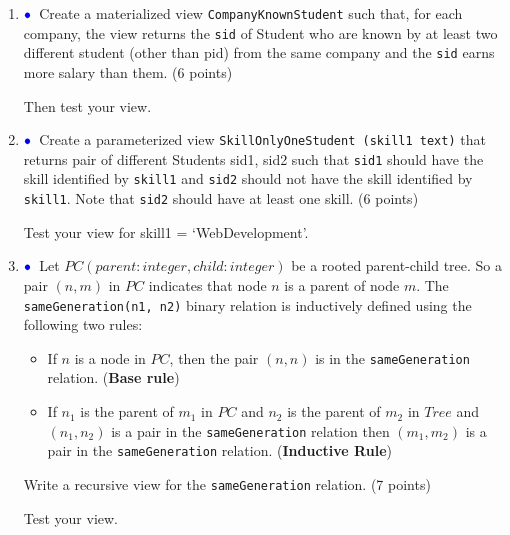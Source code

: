 \documentclass[11pt]{article}
\newcommand{\blue}[1]{{\color{blue}#1}}
\newcommand{\bluebullet}{$\blue{\bullet}$}
\begin{document}
\begin{enumerate}[resume]

\item  \label{viewtriangle} \bluebullet\ 
Create a materialized view {\tt CompanyKnownStudent} such that, for each company, the view returns the {\tt sid} of Student who are known by at least two different student (other than pid) from the same company and the {\tt sid} earns more salary than them. (6 points)


Then test your view. 

\item \bluebullet\ 	Create a parameterized view {\tt SkillOnlyOneStudent (skill1 text)} that returns pair of different Students sid1, sid2 such that {\tt sid1} should have the skill identified by {\tt skill1} and {\tt sid2} should not have the skill identified by {\tt skill1}. 
Note that {\tt sid2} should have at least one skill. (6 points)

Test your view for skill1 = ‘WebDevelopment’. 

\item \bluebullet\  Let $PC(parent: integer, child: integer)$ be a rooted parent-child tree.   So a pair $(n,m)$ in $PC$ indicates that node $n$ is a parent of node $m$.
The {\tt sameGeneration(n1, n2)} binary relation is inductively defined using the following two rules:
\begin{itemize}
\item If $n$ is a node in $PC$, then the pair $(n,n)$ is in the {\tt sameGeneration} relation. ({\bf Base rule})
\item If $n_1$ is the parent of $m_1$ in $PC$ and $n_2$ is the parent of $m_2$ in $Tree$ and 
$(n_1,n_2)$ is a pair in the {\tt sameGeneration} relation then $(m_1,m_2)$ is a pair in the {\tt sameGeneration} relation. ({\bf Inductive Rule})
\end{itemize}

Write a \blue{recursive view} for the {\tt sameGeneration} relation. (7 points) 

Test your view. 
\end{enumerate}
\end{document}
